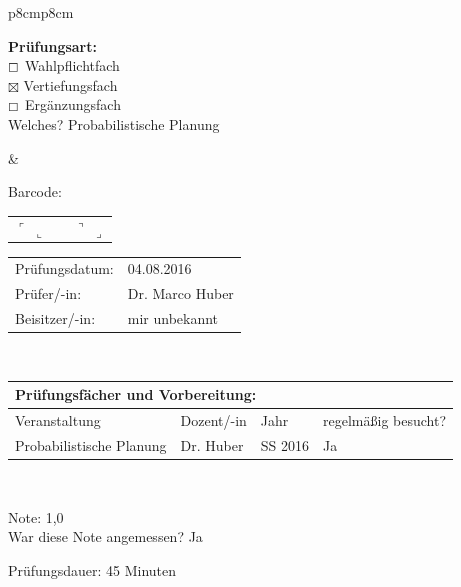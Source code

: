 \documentclass[a4paper]{article}
\newcommand{\Fach}{Probabilistische Planung}
\newcommand{\Pruefungsdatum}{04.08.2016}    %
\newcommand{\Pruefer}{Dr. Marco Huber}
\newcommand{\Beisitzer}{mir unbekannt}
\newcommand{\Note}{1,0}
\newcommand{\Dauer}{45} %
\begin{document}
\begin{tabular}{p{8cm}p{8cm}}
\begin{flushleft}
   \textbf{Prüfungsart:}\\
   $\boxempty$ Wahlpflichtfach  \\
   $\boxtimes$ Vertiefungsfach  \\
   $\boxempty$ Ergänzungsfach  \\[0.5cm]
   Welches? \Fach
  \end{flushleft}
  &
  \begin{center}
   Barcode:
   \begin{tabular}{p{0.2cm}p{6.8cm}p{0.2cm}}
   $\ulcorner$
   \vskip 2cm
   $\llcorner$ & & $\urcorner$
   \vskip 2cm
   $\lrcorner$ \\
   \end{tabular}
  \end{center}
  \vskip 0.5cm
  \begin{flushright}
  \begin{tabular}{ll}
   Prüfungsdatum:   & \Pruefungsdatum \\[0.5cm]
   Prüfer/-in:      & \Pruefer \\[0.5cm]
   Beisitzer/-in:   & \Beisitzer \\
  \end{tabular}
  \end{flushright} \\
 \end{tabular}

 \begin{tabular}{|p{8.2cm}|p{3cm}|p{1cm}|p{3.5cm}|}
  \multicolumn{4}{l}{\bfseries Prüfungsfächer und Vorbereitung: } \\[0.2cm]
  \hline
  Veranstaltung & Dozent/-in  & Jahr & regelmäßig besucht? \\
  \hline
  \hline
  Probabilistische Planung & Dr. Huber & SS 2016 &  Ja \\[0.2cm]
  \hline
 \end{tabular} \\[0.5cm]

\begin{multicols}{2}
Note: \Note\\[0.5cm]
War diese Note angemessen?
Ja

\columnbreak
Prüfungsdauer: \Dauer{} Minuten \\[0.5cm]
\end{multicols}
\end{document}
